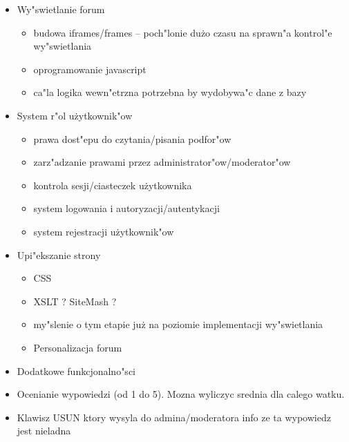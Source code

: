 \documentclass[12pt,a4paper,twoside]{article}
\begin{document}
\begin{itemize}
\item		Wy"swietlanie forum
	\begin{itemize}
		\item budowa iframes/frames -- poch"lonie du\.zo czasu na sprawn"a kontrol"e wy"swietlania
		\item oprogramowanie javascript
		\item ca"la logika wewn"etrzna potrzebna by wydobywa"c dane z bazy
	\end{itemize}
\item 		System r"ol u\.zytkownik"ow
	\begin{itemize}
		\item prawa dost"epu do czytania/pisania podfor"ow
		\item zarz"adzanie prawami przez administrator"ow/moderator"ow
		\item kontrola sesji/ciasteczek u\.zytkownika
		\item system logowania i autoryzacji/autentykacji
		\item system rejestracji u\.zytkownik"ow
	\end{itemize}	
\item 		Upi"ekszanie strony
	\begin{itemize}
		\item CSS
		\item XSLT ? SiteMash ?
		\item my"slenie o tym etapie ju\.z na poziomie implementacji wy"swietlania
		\item Personalizacja forum
	\end{itemize}	
\item 		Dodatkowe funkcjonalno"sci
\end{itemize}		

\begin{itemize}
\item Ocenianie wypowiedzi (od 1 do 5). Mozna wyliczyc srednia dla calego watku.
\item Klawisz USUN ktory wysyla do admina/moderatora info ze ta wypowiedz jest nieladna
\end{itemize}
\end{document}
